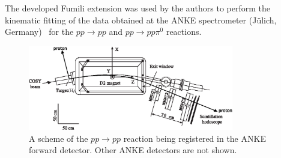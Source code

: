 The developed Fumili extension was used by the authors to perform the kinematic fitting of the data obtained at the ANKE spectrometer (Jülich, Germany)~\cite{anke} for the $pp \to pp$ and $pp \to pp\pi^0$ reactions.


\begin{figure}[htbp]\centering
\includegraphics[width=0.8\textwidth]{pics/setup_bw.eps}
\caption{
A scheme of the $pp \to pp$ reaction being registered in the ANKE forward detector. Other ANKE detectors are not shown.
}
\label{anke_scheme}
\end{figure}

